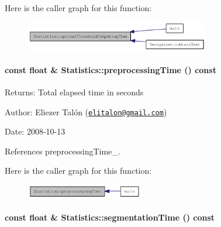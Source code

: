 Here is the caller graph for this function:\nopagebreak
\begin{figure}[H]
\begin{center}
\leavevmode
\includegraphics[width=227pt]{class_statistics_3a364709b9fe8dbefd03b3bb45d9a89d_icgraph}
\end{center}
\end{figure}
\hypertarget{class_statistics_96aafebb86be480130007bd437875156}{
\paragraph[{preprocessingTime}]{\setlength{\rightskip}{0pt plus 5cm}const float \& Statistics::preprocessingTime () const}\hfill}
\label{class_statistics_96aafebb86be480130007bd437875156}


\begin{Desc}
\item[Returns:]Total elapsed time in seconds\end{Desc}
\begin{Desc}
\item[Author:]Eliezer Talón (\href{mailto:elitalon@gmail.com}{\tt elitalon@gmail.com}) \end{Desc}
\begin{Desc}
\item[Date:]2008-10-13 \end{Desc}


References preprocessingTime\_\-.

Here is the caller graph for this function:\nopagebreak
\begin{figure}[H]
\begin{center}
\leavevmode
\includegraphics[width=144pt]{class_statistics_96aafebb86be480130007bd437875156_icgraph}
\end{center}
\end{figure}
\hypertarget{class_statistics_4cea19c3705fc315ce2b4300b3725ab8}{
\paragraph[{segmentationTime}]{\setlength{\rightskip}{0pt plus 5cm}const float \& Statistics::segmentationTime () const}\hfill}
\label{class_statistics_4cea19c3705fc315ce2b4300b3725ab8}


